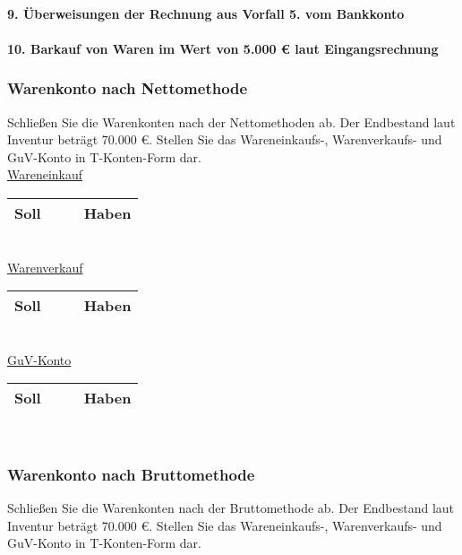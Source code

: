 \documentclass[paper=a4, fontsize=11pt]{scrartcl}
\numberwithin{equation}{section}
\numberwithin{figure}{section}
\numberwithin{table}{section}
\begin{document}
\paragraph{9. Überweisungen der Rechnung aus Vorfall 5. vom Bankkonto}

\paragraph{10. Barkauf von Waren im Wert von 5.000 € laut Eingangsrechnung}


\subsubsection{Warenkonto nach Nettomethode}

Schließen Sie die Warenkonten nach der Nettomethoden ab. Der Endbestand laut Inventur beträgt 70.000 €. Stellen Sie das Wareneinkaufs-, Warenverkaufs- und GuV-Konto in T-Konten-Form dar. \\

\underline{Wareneinkauf}

\begin{tabular}{cc|cc}
\hline
Soll & & & Haben \\
\hline
\end{tabular}
\\

\underline{Warenverkauf}

\begin{tabular}{cc|cc}
\hline
Soll & & & Haben \\
\hline
\end{tabular}
\\

\underline{GuV-Konto}

\begin{tabular}{cc|cc}
\hline
Soll & & & Haben \\
\hline
\end{tabular}
\\


\subsubsection{Warenkonto nach Bruttomethode}

Schließen Sie die Warenkonten nach der Bruttomethode ab. Der Endbestand laut Inventur beträgt 70.000 €. Stellen Sie das Wareneinkaufs-, Warenverkaufs- und GuV-Konto in T-Konten-Form dar. \\
\end{document}
